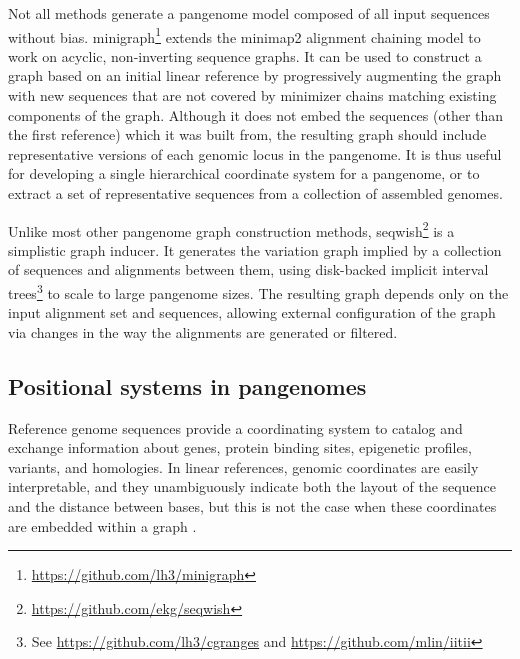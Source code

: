Not all methods generate a pangenome model composed of all input sequences without bias.
minigraph\footnote{\url{https://github.com/lh3/minigraph}} extends the minimap2 \cite{Li_2018} alignment chaining model to work on acyclic, non-inverting sequence graphs.
It can be used to construct a graph based on an initial linear reference by progressively augmenting the graph with new sequences that are not covered by minimizer chains matching existing components of the graph.
Although it does not embed the sequences (other than the first reference) which it was built from, the resulting graph should include representative versions of each genomic locus in the pangenome.
It is thus useful for developing a single hierarchical coordinate system for a pangenome, or to extract a set of representative sequences from a collection of assembled genomes.

Unlike most other pangenome graph construction methods, seqwish\footnote{\url{https://github.com/ekg/seqwish}} \cite{Garrison_2019} is a simplistic graph inducer.
It generates the variation graph implied by a collection of sequences and alignments between them, using disk-backed implicit interval trees\footnote{See \url{https://github.com/lh3/cgranges} and \url{https://github.com/mlin/iitii}} to scale to large pangenome sizes.
The resulting graph depends only on the input alignment set and sequences, allowing external configuration of the graph via changes in the way the alignments are generated or filtered.








\subsection{Positional systems in pangenomes}

Reference genome sequences provide a coordinating system to catalog and exchange information about genes, protein binding sites, epigenetic profiles, variants, and homologies.
In linear references, genomic coordinates are easily interpretable, and they unambiguously indicate both the layout of the sequence and the distance between bases, but this is not the case when these coordinates are embedded within a graph \cite{Rand_2017}.

